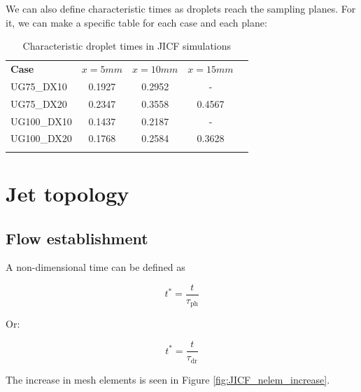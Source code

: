 We can also define characteristic times as droplets reach the sampling planes. For it, we can make a specific table for each case and each plane:

\begin{table}[!h]
\centering
\caption{Characteristic droplet times in JICF simulations}
\begin{tabular}{lcccc}
\thickhline
\textbf{Case} & $x = 5 mm$ & $x = 10 mm$ & $x = 15 mm$  \\
\thickhline 
UG75\_DX10  & 0.1927 & 0.2952 & -  \\
UG75\_DX20  & 0.2347 & 0.3558 & 0.4567 \\
UG100\_DX10 & 0.1437 & 0.2187 & - \\
UG100\_DX20 & 0.1768 & 0.2584 & 0.3628 \\
\thickhline
\end{tabular}
\label{tab:jicf_characteristic_droplet_sampling_times}
\end{table}



\section{Jet topology}


\subsection{Flow establishment}

A non-dimensional time can be defined as

\begin{equation}
t^* = \frac{t}{\tau_\mathrm{ph}}
\end{equation}

Or:

\begin{equation}
t^* = \frac{t}{\tau_\mathrm{dr}}
\end{equation}


The increase in mesh elements is seen in Figure \ref{fig:JICF_nelem_increase}.

